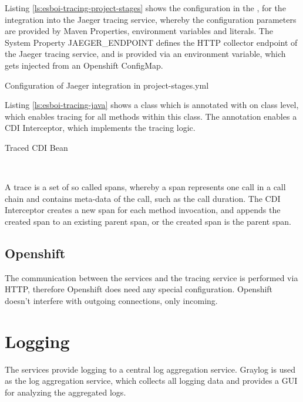 Listing \vref{ls:esboi-tracing-project-stages} shows the configuration  in the , for the integration into the Jaeger tracing service, whereby the configuration parameters are provided by Maven Properties, environment variables and literals. The System Property JAEGER\_ENDPOINT defines the HTTP collector endpoint of the Jaeger tracing service, and is provided via an environment variable, which gets injected from an Openshift ConfigMap.

\begin{listing}[h]
	\caption{Configuration of Jaeger integration in project-stages.yml}
	\label{ls:esboi-tracing-project-stages}
\end{listing}

Listing \vref{ls:esboi-tracing-java} shows a class which is annotated with  on class level, which enables tracing for all methods within this class. The annotation  enables a CDI Interceptor, which implements the tracing logic. \\

\begin{listing}[h]
	\caption{Traced CDI Bean}
	\label{ls:esboi-tracing-java}
\end{listing}
\ \newpage

A trace is a set of so called spans, whereby a span represents one call in a call chain and contains meta-data of the call, such as the call duration. The CDI Interceptor creates a new span for each method invocation, and appends the created span to an existing parent span, or the created span is the parent span. 

\subsection{Openshift}
\label{sec:esbi-tracing-openshift}
The communication between the services and the tracing service is performed via HTTP, therefore Openshift does need any special configuration. Openshift doesn't interfere with outgoing connections, only incoming.

\section{Logging}
\label{sec:esbi-logging}
The services provide logging to a central log aggregation service. Graylog is used as the log aggregation service, which collects all logging data and provides a GUI for analyzing the aggregated logs\cite{Graylog2018}.

